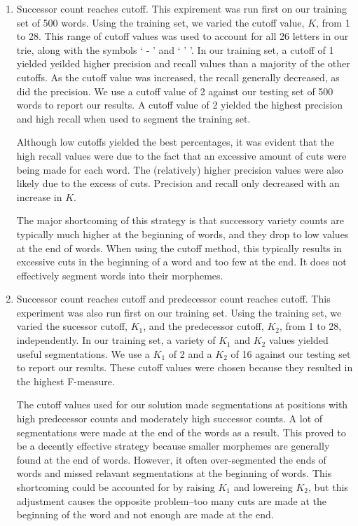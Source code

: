 \documentclass[11pt,letterpaper]{article}
\begin{document}
\begin{enumerate}
\item Successor count reaches cutoff. This expirement was run first on our training set of 500 words. Using the training set, we varied the cutoff value, $K$, from 1 to 28. This range of cutoff values was used to account for all 26 letters in our trie, along with the symbols ` - ' and ` ' '. In our training set, a cutoff of 1 yielded yeilded higher precision and recall values than a majority of the other cutoffs. As the cutoff value was increased, the recall generally decreased, as did the precision. We use a cutoff value of 2 against our testing set of 500 words to report our results. A cutoff value of 2 yielded the highest precision and high recall when used to segment the training set.

  Although low cutoffs yielded the best percentages, it was evident that the high recall values were due to the fact that an excessive amount of cuts were being made for each word. The (relatively) higher precision values were also likely due to the excess of cuts. Precision and recall only decreased with an increase in $K$. 

The major shortcoming of this strategy is that successory variety counts are typically much higher at the beginning of words, and they drop to low values at the end of words. When using the cutoff method, this typically results in excessive cuts in the beginning of a word and too few at the end. It does not effectively segment words into their morphemes.

\item Successor count reaches cutoff and predecessor count reaches cutoff. This experiment was also run first on our training set. Using the training set, we varied the sucessor cutoff, $K_{1}$, and the predecessor cutoff, $K_{2}$, from 1 to 28, independently. In our training set, a variety of $K_{1}$ and $K_{2}$ values yielded useful segmentations. We use a $K_{1}$ of 2 and a $K_{2}$ of 16 against our testing set to report our results. These cutoff values were chosen because they resulted in the highest F-measure.

The cutoff values used for our solution made segmentations at positions with high predecessor counts and moderately high successor counts. A lot of segmentations were made at the end of the words as a result. This proved to be a decently effective strategy because smaller morphemes are generally found at the end of words. However, it often over-segmented the ends of words and missed relavant segmentations at the beginning of words. This shortcoming could be accounted for by raising $K_{1}$ and lowereing $K_{2}$, but this adjustment causes the opposite problem--too many cuts are made at the beginning of the word and not enough are made at the end.


\end{enumerate}
\end{document}
